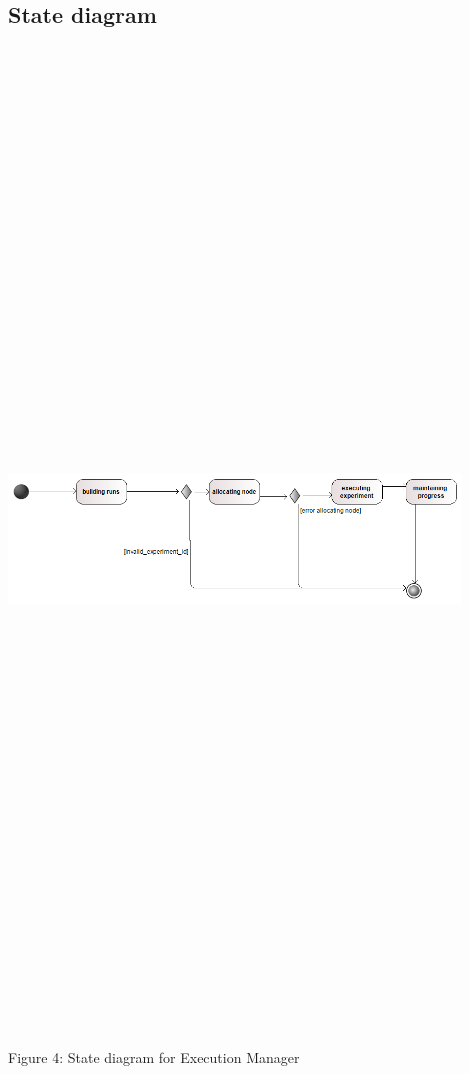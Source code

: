 \subsection{State diagram}
    \includegraphics[width=12cm,height=26cm,keepaspectratio]{execution_manager/images/execution_manager_state_diagram.png}
	\begin{center}
	    \small{Figure 4: State diagram for Execution Manager}
    \end{center}




